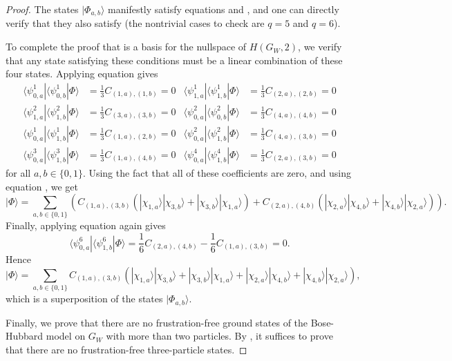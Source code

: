 \documentclass[../thesis-main/thesis-main]{subfiles}
\begin{document}
\begin{proof}
The states $|\Phi_{a,b}\rangle$ manifestly satisfy equations  and , and one can directly verify that they also satisfy  (the nontrivial cases to check are $q=5$ and $q=6$). 

To complete the proof that  is a basis for the nullspace of $H(G_W,2)$, we verify that any state satisfying these conditions must be a linear combination of these four states. Applying equation  gives
\begin{align*}
\langle\psi_{0,a}^{1}|\langle\psi_{0,b}^{1}|\Phi\rangle & =\frac{1}{3} C_{(1,a),(1,b)}=0 &
\langle\psi_{1,a}^{1}|\langle\psi_{1,b}^{1}|\Phi\rangle & =\frac{1}{3} C_{(2,a),(2,b)}=0\\
\langle\psi_{1,a}^{2}|\langle\psi_{1,b}^{2}|\Phi\rangle & =\frac{1}{3} C_{(3,a),(3,b)}=0 &
\langle\psi_{0,a}^{2}|\langle\psi_{0,b}^{2}|\Phi\rangle & =\frac{1}{3} C_{(4,a),(4,b)}=0\\
\langle\psi_{0,a}^{1}|\langle\psi_{1,b}^{1}|\Phi\rangle & =\frac{1}{3} C_{(1,a),(2,b)}=0 &
\langle\psi_{0,a}^{2}|\langle\psi_{1,b}^{2}|\Phi\rangle & =\frac{1}{3} C_{(4,a),(3,b)}=0\\
\langle\psi_{0,a}^{3}|\langle\psi_{1,b}^{3}|\Phi\rangle & =\frac{1}{3} C_{(1,a),(4,b)}=0 &
\langle\psi_{0,a}^{4}|\langle\psi_{1,b}^{4}|\Phi\rangle & =\frac{1}{3} C_{(2,a),(3,b)}=0
\end{align*}
for all $a,b\in \{0,1\}$. Using the fact that all of these coefficients are zero, and using equation , we get 
\[
|\Phi\rangle=\sum_{a,b\in\{0,1\}}\left(C_{(1,a),(3,b)}\left(|\chi_{1,a}\rangle|\chi_{3,b}\rangle+|\chi_{3,b}\rangle|\chi_{1,a}\rangle\right)+C_{(2,a),(4,b)}\left(|\chi_{2,a}\rangle|\chi_{4,b}\rangle+|\chi_{4,b}\rangle|\chi_{2,a}\rangle\right)\right).
\]
Finally, applying equation  again gives
\[
\langle\psi_{0,a}^{6}|\langle\psi_{1,b}^{6}|\Phi\rangle=\frac{1}{6}C_{(2,a),(4,b)}-\frac{1}{6}C_{(1,a),(3,b)}=0.
\]
Hence
\[
|\Phi\rangle=\sum_{a,b\in\{0,1\}}C_{(1,a),(3,b)}\left(|\chi_{1,a}\rangle|\chi_{3,b}\rangle+|\chi_{3,b}\rangle|\chi_{1,a}\rangle+|\chi_{2,a}\rangle|\chi_{4,b}\rangle+|\chi_{4,b}\rangle|\chi_{2,a}\rangle\right),
\]
which is a superposition of the states $|\Phi_{a,b}\rangle.$ 

Finally, we prove that there are no frustration-free ground states of the Bose-Hubbard model on $G_{W}$ with more than two particles. By ,
it suffices to prove that there are no frustration-free three-particle states.


\end{proof}
\end{document}
